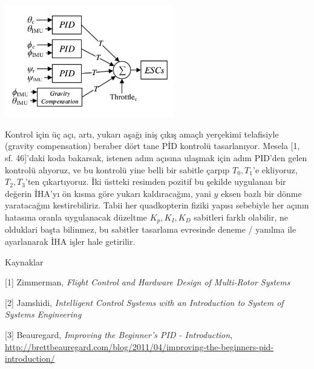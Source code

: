 \documentclass[12pt,fleqn]{article}\usepackage{../../common}
\begin{document}
\includegraphics[width=20em]{phy_030_pid_05.png}

Kontrol için üç açı, artı, yukarı aşağı iniş çıkış amaçlı yerçekimi
telafisiyle (gravity compensation) beraber dört tane PİD kontrolü
tasarlanıyor. Mesela [1, sf. 46]'daki koda bakarsak, istenen adım açısına
ulaşmak için adım PID'den gelen kontrolü alıyoruz, ve bu kontrolü yine
belli bir sabitle çarpıp $T_0,T_1$'e ekliyoruz, $T_2,T_3$'ten
çıkartıyoruz. İki üstteki resimden pozitif bu şekilde uygulanan bir değerin
İHA'yı ön kısma göre yukarı kaldıracağını, yani $y$ eksen bazlı bir dönme
yaratacağını kestirebiliriz. Tabii her quadkopterin fiziki yapısı sebebiyle
her açının hatasına oranla uygulanacak düzeltme $K_p,K_I,K_D$ sabitleri
farklı olabilir, ne olduklari başta bilinmez, bu sabitler tasarlama
evresinde deneme / yanılma ile ayarlanarak İHA işler hale getirilir.

Kaynaklar

[1] Zimmerman, {\em Flight Control and Hardware Design of Multi-Rotor Systems}

[2] Jamshidi, {\em Intelligent Control Systems with an Introduction to System of Systems Engineering}

[3] Beauregard, {\em Improving the Beginner's PID - Introduction}, 
    \url{http://brettbeauregard.com/blog/2011/04/improving-the-beginners-pid-introduction/}
\end{document}
